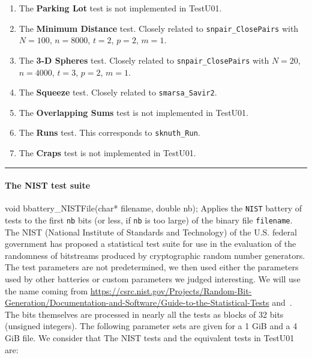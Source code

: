 \begin{enumerate}
\item The {\bf Parking Lot} test is not implemented in TestU01.

\item The {\bf Minimum Distance} test. Closely related
  to {\tt snpair\_ClosePairs}  with
 $N=100$, $n=8000$, $t=2$, $p=2$, $m=1$.

\item The {\bf 3-D Spheres} test. Closely related
  to {\tt snpair\_ClosePairs}  with
 $N=20$, $n=4000$, $t=3$, $p=2$, $m=1$.

\item The {\bf Squeeze} test.  Closely related
  to {\tt smarsa\_Savir2}.

\item The {\bf Overlapping Sums} test  is not implemented in TestU01.

\item The {\bf Runs} test.  This corresponds to  {\tt sknuth\_Run}.

\item The {\bf Craps} test  is not implemented in TestU01.

\end{enumerate}


\bigskip
\hrule

\paragraph{The NIST test suite}

\code


void bbattery_NISTFile(char* filename, double nb);
\endcode
\tab
  Applies the {\tt NIST} battery of tests to the first {\tt nb}
  bits (or less, if {\tt nb} is too large) of the binary file
  {\tt filename}.
  The NIST (National Institute of Standards and Technology) of the U.S.
  federal government has proposed a statistical test suite \cite{rRUK01a}
  for use in the evaluation of the randomness of bitstreams
  produced by cryptographic random number generators.
  The test parameters are not predetermined, we then used either the parameters
  used by other batteries or custom parameters we judged interesting.
  We will use the name coming from
  \url{https://csrc.nist.gov/Projects/Random-Bit-Generation/Documentation-and-Software/Guide-to-the-Statistical-Tests}
  and~\cite{rRUK03a}. The bits themselves are processed in nearly all the tests
  as blocks of 32 bits (unsigned integers). The following parameter sets are
  given for a 1 GiB and a 4 GiB file. We consider that 
  The NIST tests and the equivalent tests in TestU01 are:

